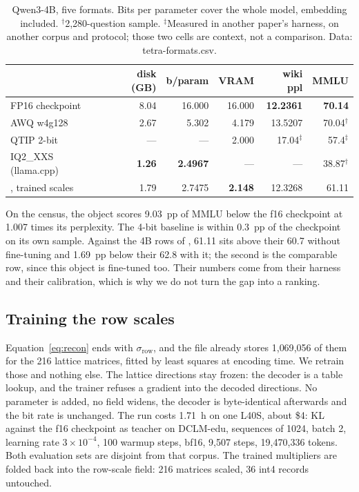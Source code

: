 \begin{table}[t]
\centering\footnotesize\setlength{\tabcolsep}{4pt}
\begin{tabular}{lrrrrr}
\toprule
 & disk (GB) & b/param & VRAM \bw{} & wiki ppl & MMLU\\
\midrule
FP16 checkpoint & 8.04 & 16.000 & 16.000 & \textbf{12.2361} & \textbf{70.14}\\
AWQ w4g128 & 2.67 & 5.302 & 4.179 & 13.5207 & 70.04$^\dagger$\\
QTIP 2-bit & --- & --- & 2.000 & 17.04$^\ddagger$ & 57.4$^\ddagger$\\
IQ2\_XXS (llama.cpp) & \textbf{1.26} & \textbf{2.4967} & --- & --- & 38.87$^\dagger$\\
\Tetra{}, trained scales & 1.79 & 2.7475 & \textbf{2.148} & 12.3268 & 61.11\\
\bottomrule
\end{tabular}
\caption{Qwen3-4B, five formats. Bits per parameter cover the whole model,
embedding included. $^\dagger$2{,}280-question sample. $^\ddagger$Measured in
another paper's harness, on another corpus and protocol; those two cells are
context, not a comparison. Data: tetra-formats.csv.}
\label{tab:formats}
\end{table}

On the census, the object scores 9.03~pp of MMLU below the f16 checkpoint at
1.007 times its perplexity. The 4-bit baseline is within 0.3~pp of the
checkpoint on its own sample. Against the 4B rows of \citet{llvq2026}, 61.11
sits above their 60.7 without fine-tuning and 1.69~pp below their 62.8 with
it; the second is the comparable row, since this object is fine-tuned too.
Their numbers come from their harness and their calibration, which is why we
do not turn the gap into a ranking.

\subsection{Training the row scales}
\label{sec:rowscales}

Equation~\eqref{eq:recon} ends with $\sigma_{\mathrm{row}}$, and the file
already stores 1{,}069{,}056 of them for the 216 lattice matrices, fitted by
least squares at encoding time. We retrain those and nothing else. The lattice
directions stay frozen: the decoder is a table lookup, and the trainer refuses
a gradient into the decoded directions. No parameter is added, no field widens,
the decoder is byte-identical afterwards and the bit rate is unchanged. The
run costs 1.71~h on one L40S, about \$4: KL against the f16 checkpoint as
teacher on DCLM-edu, sequences of 1024, batch 2, learning rate
$3\times10^{-4}$, 100 warmup steps, bf16, 9{,}507 steps, 19{,}470{,}336 tokens.
Both evaluation sets are disjoint from that corpus. The trained multipliers are
folded back into the row-scale field: 216 matrices scaled, 36 int4 records
untouched.

